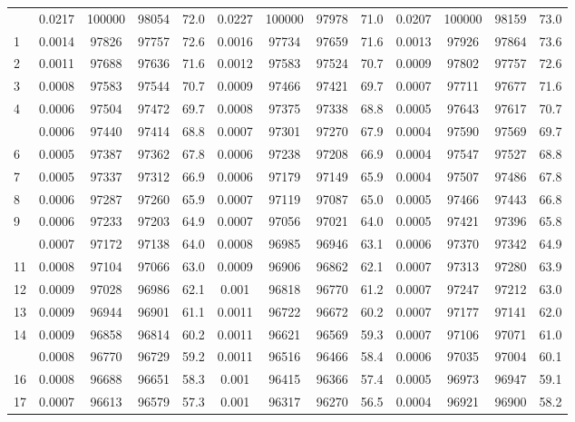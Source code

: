 \documentclass[
  14pt,
]{article}
\begin{document}
\begin{longtable}[t]{lcccccccccccc}
\endfoot
\bottomrule
\endlastfoot
0 & 0.0217 & 100000 & 98054 & 72.0 & 0.0227 & 100000 & 97978 & 71.0 & 0.0207 & 100000 & 98159 & 73.0\\
1 & 0.0014 & 97826 & 97757 & 72.6 & 0.0016 & 97734 & 97659 & 71.6 & 0.0013 & 97926 & 97864 & 73.6\\
2 & 0.0011 & 97688 & 97636 & 71.6 & 0.0012 & 97583 & 97524 & 70.7 & 0.0009 & 97802 & 97757 & 72.6\\
3 & 0.0008 & 97583 & 97544 & 70.7 & 0.0009 & 97466 & 97421 & 69.7 & 0.0007 & 97711 & 97677 & 71.6\\
4 & 0.0006 & 97504 & 97472 & 69.7 & 0.0008 & 97375 & 97338 & 68.8 & 0.0005 & 97643 & 97617 & 70.7\\
\addlinespace
5 & 0.0006 & 97440 & 97414 & 68.8 & 0.0007 & 97301 & 97270 & 67.9 & 0.0004 & 97590 & 97569 & 69.7\\
6 & 0.0005 & 97387 & 97362 & 67.8 & 0.0006 & 97238 & 97208 & 66.9 & 0.0004 & 97547 & 97527 & 68.8\\
7 & 0.0005 & 97337 & 97312 & 66.9 & 0.0006 & 97179 & 97149 & 65.9 & 0.0004 & 97507 & 97486 & 67.8\\
8 & 0.0006 & 97287 & 97260 & 65.9 & 0.0007 & 97119 & 97087 & 65.0 & 0.0005 & 97466 & 97443 & 66.8\\
9 & 0.0006 & 97233 & 97203 & 64.9 & 0.0007 & 97056 & 97021 & 64.0 & 0.0005 & 97421 & 97396 & 65.8\\
\addlinespace
10 & 0.0007 & 97172 & 97138 & 64.0 & 0.0008 & 96985 & 96946 & 63.1 & 0.0006 & 97370 & 97342 & 64.9\\
11 & 0.0008 & 97104 & 97066 & 63.0 & 0.0009 & 96906 & 96862 & 62.1 & 0.0007 & 97313 & 97280 & 63.9\\
12 & 0.0009 & 97028 & 96986 & 62.1 & 0.001 & 96818 & 96770 & 61.2 & 0.0007 & 97247 & 97212 & 63.0\\
13 & 0.0009 & 96944 & 96901 & 61.1 & 0.0011 & 96722 & 96672 & 60.2 & 0.0007 & 97177 & 97141 & 62.0\\
14 & 0.0009 & 96858 & 96814 & 60.2 & 0.0011 & 96621 & 96569 & 59.3 & 0.0007 & 97106 & 97071 & 61.0\\
\addlinespace
15 & 0.0008 & 96770 & 96729 & 59.2 & 0.0011 & 96516 & 96466 & 58.4 & 0.0006 & 97035 & 97004 & 60.1\\
16 & 0.0008 & 96688 & 96651 & 58.3 & 0.001 & 96415 & 96366 & 57.4 & 0.0005 & 96973 & 96947 & 59.1\\
17 & 0.0007 & 96613 & 96579 & 57.3 & 0.001 & 96317 & 96270 & 56.5 & 0.0004 & 96921 & 96900 & 58.2\\

\end{longtable}
\end{document}
